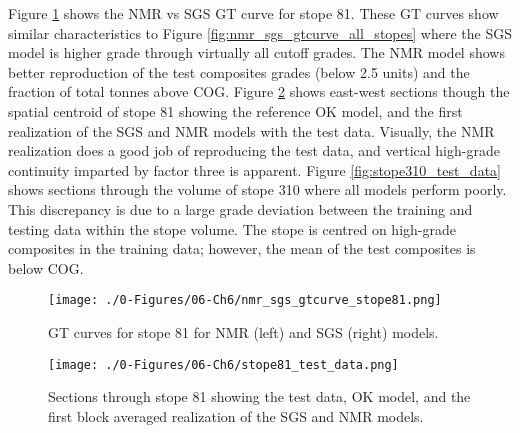 \begin{table}[!htb]
    \centering
    \caption{\% difference in expected value between test data, \gls{OK} mean, \gls{SGS} expected value and \gls{NMR} expected value by stope (>2.0 unit \gls{COG}). Stopes with greater than 15 test data are shown. Values are sorted in ascending order by \gls{NMR} expected value.}
    \resizebox{0.9\width}{!}{}
    \label{tab:nmr_sgs_stope_delta}
\end{table}

Figure \ref{fig:nmr_sgs_gtcurve_stope81} shows the \gls{NMR} vs \gls{SGS} \gls{GT} curve for stope 81. These \gls{GT} curves show similar characteristics to Figure \ref{fig:nmr_sgs_gtcurve_all_stopes} where the \gls{SGS} model is higher grade through virtually all cutoff grades. The \gls{NMR} model shows better reproduction of the test composites grades (below 2.5 units) and the fraction of total tonnes above \gls{COG}. Figure \ref{fig:stope81_test_data} shows east-west sections though the spatial centroid of stope 81 showing the reference \gls{OK} model, and the first realization of the \gls{SGS} and \gls{NMR} models with the test data. Visually, the \gls{NMR} realization does a good job of reproducing the test data, and vertical high-grade continuity imparted by factor three is apparent. Figure \ref{fig:stope310_test_data} shows sections through the volume of stope 310 where all models perform poorly. This discrepancy is due to a large grade deviation between the training and testing data within the stope volume. The stope is centred on high-grade composites in the training data; however, the mean of the test composites is below \gls{COG}.

\begin{figure}[htb!]
    \centering
    \texttt{[image: ./0-Figures/06-Ch6/nmr\_sgs\_gtcurve\_stope81.png]}
    \caption{\Gls{GT} curves for stope 81 for \gls{NMR} (left) and \gls{SGS} (right) models. }
    \label{fig:nmr_sgs_gtcurve_stope81}
\end{figure}

\begin{figure}[htb!]
    \centering
    \texttt{[image: ./0-Figures/06-Ch6/stope81\_test\_data.png]}
    \caption{Sections through stope 81 showing the test data, \gls{OK} model, and the first block averaged realization of the \gls{SGS} and \gls{NMR} models.}
    \label{fig:stope81_test_data}
\end{figure}

